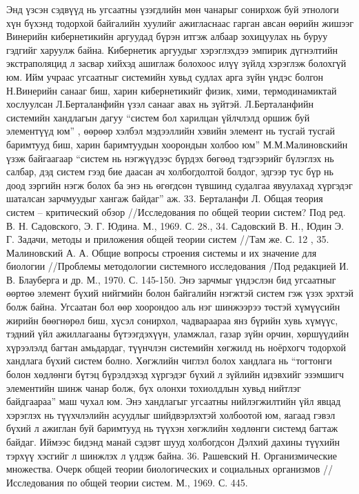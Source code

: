 Энд үзсэн сэдвүүд нь угсаатны үзэгдлийн мөн чанарыг сонирхож буй этнологи хүн бүхэнд тодорхой байгалийн хуулийг ажигласнаас гарган авсан өөрийн жишээг Винерийн кибернетикийн аргуудад бүрэн итгэж албаар зохицуулах нь буруу гэдгийг харуулж байна. Кибернетик аргуудыг хэрэглэхдээ эмпирик дүгнэлтийн экстраполяцид л засвар хийхэд ашиглаж болохоос илүү зүйлд хэрэглэж болохгүй юм. Ийм учраас угсаатныг системийн хувьд судлах арга зүйн үндэс болгон Н.Винерийн санааг биш, харин кибернетикийг физик, хими, термодинамиктай хослуулсан Л.Берталанфийн үзэл санааг авах нь зүйтэй.
Л.Берталанфийн системийн хандлагын дагуу “систем бол харилцан үйлчлэлд оршиж буй элементүүд юм” , өөрөөр хэлбэл мэдээллийн хэвийн элемент нь тусгай тусгай баримтууд биш, харин баримтуудын хоорондын холбоо юм” М.М.Малиновскийн үзэж байгаагаар “систем нь нэгжүүдээс бүрдэх бөгөөд тэдгээрийг бүлэглэх нь салбар, дэд систем гээд бие даасан ач холбогдолтой болдог, эдгээр тус бүр нь доод зэргийн нэгж болох ба энэ нь өгөгдсөн түвшинд судалгаа явуулахад хүргэдэг шаталсан зарчмуудыг хангаж байдаг” аж.
33. Берталанфи Л. Общая теория систем – критический обзор //Исследования по общей теории систем? Под ред. В. Н. Садовского, Э. Г. Юдина. М., 1969. С. 28., 34. Садовский В. Н., Юдин Э. Г. Задачи, методы и приложения общей теории систем //Там же. С. 12 , 35. Малиновский А. А. Общие вопросы строения системы и их значение для биологии //Проблемы методологии системного исследования /Под редакцией И. В. Блауберга и др. М., 1970. С. 145-150.
Энэ зарчмыг үндэслэн бид угсаатныг өөртөө элемент бүхий нийгмийн болон байгалийн нэгжтэй систем гэж үзэх эрхтэй болж байна. Угсаатан бол өөр хоорондоо аль нэг шинжээрээ төстэй хүмүүсийн жирийн бөөгнөрөл биш, хүсэл сонирхол, чадвараараа янз бүрийн хувь хүмүүс, тэдний үйл ажиллагааны бүтээгдэхүүн, уламжлал, газар зүйн орчин, хөршүүдийн хүрээлэлд багтан амьдардаг, түүнчлэн системийн хөгжилд нь ноёрхогч тодорхой хандлага бүхий систем болно. Хөгжлийн чиглэл болох хандлага нь “тогтонги болон хөдлөнги бүтэц бүрэлдэхэд хүргэдэг бүхий л зүйлийн идэвхийг эзэмшигч элементийн шинж чанар болж, бүх олонхи тохиолдлын хувьд нийтлэг байдгаараа” маш чухал юм. Энэ хандлагыг угсаатны нийлэгжилтийн үйл явцад хэрэглэх нь түүхчлэлийн асуудлыг шийдвэрлэхтэй холбоотой юм, яагаад гэвэл бүхий л ажиглан буй баримтууд нь түүхэн хөгжлийн хөдлөнги системд багтаж байдаг. Иймээс бидэнд манай сэдэвт шууд холбогдсон Дэлхий дахины түүхийн тэрхүү хэсгийг л шинжлэх л үлдэж байна. 36. Рашевский Н. Организмические множества. Очерк общей теории биологических и социальных организмов //Исследования по общей теории систем. М., 1969. С. 445.
